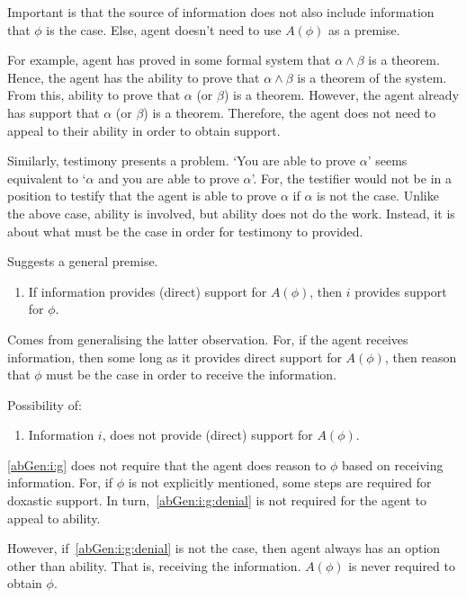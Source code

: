 \documentclass[10pt]{article}
\begin{document}
Important is that the source of information does not also include information that \(\phi\) is the case.
Else, agent doesn't need to use \(A(\phi)\) as a premise.

For example, agent has proved in some formal system that \(\alpha \land \beta\) is a theorem.
Hence, the agent has the ability to prove that \(\alpha \land \beta\) is a theorem of the system.
From this, ability to prove that \(\alpha\) (or \(\beta\)) is a theorem.
However, the agent already has support that \(\alpha\) (or \(\beta\)) is a theorem.
Therefore, the agent does not need to appeal to their ability in order to obtain support.

Similarly, testimony presents a problem.
`You are able to prove \(\alpha\)' seems equivalent to `\(\alpha\) and you are able to prove \(\alpha\)'.
For, the testifier would not be in a position to testify that the agent is able to prove \(\alpha\) if \(\alpha\) is not the case.
Unlike the above case, ability is involved, but ability does not do the work.
Instead, it is about what must be the case in order for testimony to provided.

Suggests a general premise.

\begin{enumerate}
\item\label{abGen:i:g} If information provides (direct) support for \(A(\phi)\), then \(i\) provides support for \(\phi\).
\end{enumerate}

Comes from generalising the latter observation.
For, if the agent receives information, then some long as it provides direct support for \(A(\phi)\), then reason that \(\phi\) must be the case in order to receive the information.

Possibility of:

\begin{enumerate}
\item\label{abGen:i:g:denial} Information \(i\), does not provide (direct) support for \(A(\phi)\).
\end{enumerate}

\ref{abGen:i:g} does not require that the agent does reason to \(\phi\) based on receiving information.
For, if \(\phi\) is not explicitly mentioned, some steps are required for doxastic support.
In turn,~\ref{abGen:i:g:denial} is not required for the agent to appeal to ability.

However, if~\ref{abGen:i:g:denial} is not the case, then agent always has an option other than ability.
That is, receiving the information.
\(A(\phi)\) is never required to obtain \(\phi\).
\end{document}
